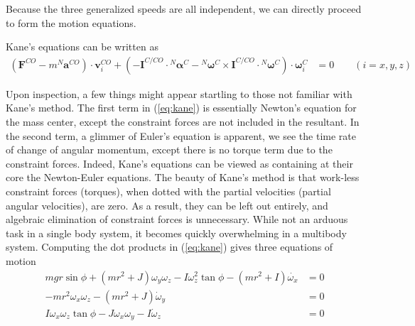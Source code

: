 \documentclass[letterpaper,11pt]{article}
\newcommand{\bs}[1]{\boldsymbol{#1}}
\begin{document}
Because the three generalized speeds are all independent, we can directly
proceed to form the motion equations.

Kane's equations can be written as
\begin{align}
    (\bs{F}^{CO} - m {}^N\bs{a}^{CO})\cdot \bs{v}^{CO}_i
    + (-\bs{I}^{C/CO} \cdot {}^N\bs{\alpha}^C
       - {}^N\bs{\omega}^C \times \bs{I}^{C/CO} \cdot {}^N\bs{\omega}^C)
       \cdot \bs{\omega}^C_i & = 0 \qquad (i = x, y, z)
       \label{eq:kane}
\end{align}

Upon inspection, a few things might appear startling to those not familiar with
Kane's method.  The first term in (\ref{eq:kane}) is essentially Newton's
equation for the mass center, except the constraint forces are not included in
the resultant.  In the second term, a glimmer of Euler's equation is apparent,
we see the time rate of change of angular momentum, except there is no torque term due to the constraint forces.  Indeed, Kane's
equations can be viewed as containing at their core the Newton-Euler equations.
The beauty of Kane's method is that work-less constraint forces (torques), when
dotted with the partial velocities (partial angular velocities), are zero.  As
a result, they can be left out entirely, and algebraic elimination of
constraint forces is unnecessary.  While not an arduous task in a single body
system, it becomes quickly overwhelming in a multibody system.  Computing the
dot products in (\ref{eq:kane}) gives three equations of motion
\begin{align}
    mgr\sin{\phi} + (mr^2 + J)\omega_y\omega_z -
    I\omega_z^2\tan{\phi} - (mr^2+I)\dot{\omega_x} &= 0 \\
       -mr^2\omega_x\omega_z - (mr^2 + J)\dot{\omega}_y &= 0 \\
    I\omega_x\omega_z\tan{\phi} - J\omega_x\omega_y - I\dot{\omega}_z &= 0
    \label{eq:eoms}
\end{align}
\end{document}
